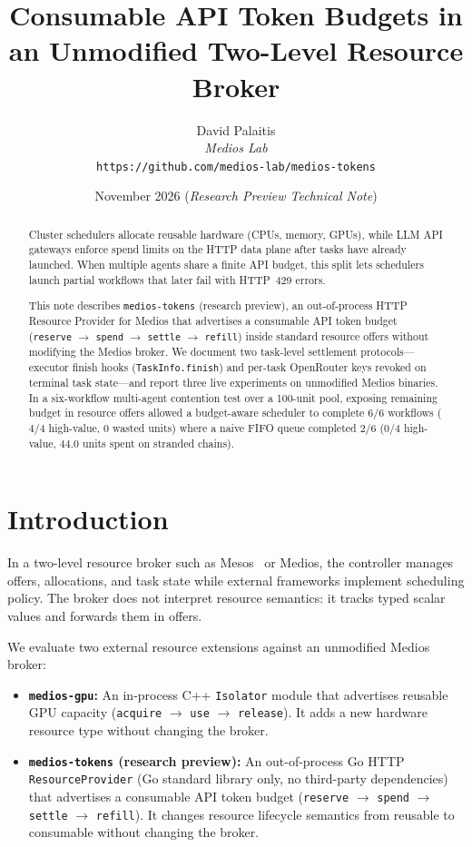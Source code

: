 \documentclass[11pt]{article}
\title{\textbf{Consumable API Token Budgets in an Unmodified Two-Level Resource Broker}}
\author{
  David Palaitis\\
  \textit{Medios Lab}\\
  \texttt{https://github.com/medios-lab/medios-tokens}
}
\date{November 2026 \quad (\textit{Research Preview Technical Note})}
\begin{document}
\maketitle

\begin{abstract}
Cluster schedulers allocate reusable hardware (CPUs, memory, GPUs), while LLM API gateways enforce spend limits on the HTTP data plane after tasks have already launched. When multiple agents share a finite API budget, this split lets schedulers launch partial workflows that later fail with HTTP~429 errors.

This note describes \texttt{medios-tokens} (research preview), an out-of-process HTTP Resource Provider for Medios that advertises a consumable API token budget (\texttt{reserve} $\rightarrow$ \texttt{spend} $\rightarrow$ \texttt{settle} $\rightarrow$ \texttt{refill}) inside standard resource offers without modifying the Medios broker. We document two task-level settlement protocols---executor finish hooks (\texttt{TaskInfo.finish}) and per-task OpenRouter keys revoked on terminal task state---and report three live experiments on unmodified Medios binaries. In a six-workflow multi-agent contention test over a 100-unit pool, exposing remaining budget in resource offers allowed a budget-aware scheduler to complete $6/6$ workflows ($4/4$ high-value, $0$ wasted units) where a naive FIFO queue completed $2/6$ ($0/4$ high-value, $44.0$ units spent on stranded chains).
\end{abstract}

\section{Introduction}
\label{sec:intro}

In a two-level resource broker such as Mesos~\cite{hindman2011mesos} or Medios, the controller manages offers, allocations, and task state while external frameworks implement scheduling policy. The broker does not interpret resource semantics: it tracks typed scalar values and forwards them in offers.

We evaluate two external resource extensions against an unmodified Medios broker:

\begin{itemize}
  \item \textbf{\texttt{medios-gpu}:} An in-process C++ \texttt{Isolator} module that advertises reusable GPU capacity (\texttt{acquire} $\rightarrow$ \texttt{use} $\rightarrow$ \texttt{release}). It adds a new hardware resource type without changing the broker.
  \item \textbf{\texttt{medios-tokens} (research preview):} An out-of-process Go HTTP \texttt{ResourceProvider} (Go standard library only, no third-party dependencies) that advertises a consumable API token budget (\texttt{reserve} $\rightarrow$ \texttt{spend} $\rightarrow$ \texttt{settle} $\rightarrow$ \texttt{refill}). It changes resource lifecycle semantics from reusable to consumable without changing the broker.
\end{itemize}
\end{document}
